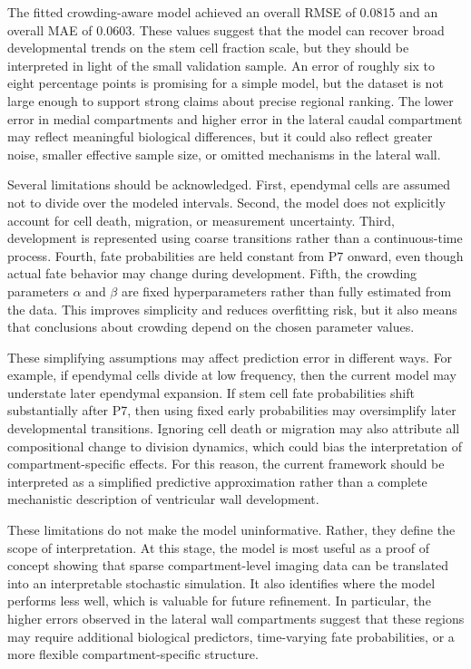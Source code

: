 \documentclass[12pt]{article}
\begin{document}
The fitted crowding-aware model achieved an overall RMSE of 0.0815 and an overall MAE of 0.0603. These values suggest that the model can recover broad developmental trends on the stem cell fraction scale, but they should be interpreted in light of the small validation sample. An error of roughly six to eight percentage points is promising for a simple model, but the dataset is not large enough to support strong claims about precise regional ranking. The lower error in medial compartments and higher error in the lateral caudal compartment may reflect meaningful biological differences, but it could also reflect greater noise, smaller effective sample size, or omitted mechanisms in the lateral wall.

Several limitations should be acknowledged. First, ependymal cells are assumed not to divide over the modeled intervals. Second, the model does not explicitly account for cell death, migration, or measurement uncertainty. Third, development is represented using coarse transitions rather than a continuous-time process. Fourth, fate probabilities are held constant from P7 onward, even though actual fate behavior may change during development. Fifth, the crowding parameters $\alpha$ and $\beta$ are fixed hyperparameters rather than fully estimated from the data. This improves simplicity and reduces overfitting risk, but it also means that conclusions about crowding depend on the chosen parameter values.

These simplifying assumptions may affect prediction error in different ways. For example, if ependymal cells divide at low frequency, then the current model may understate later ependymal expansion. If stem cell fate probabilities shift substantially after P7, then using fixed early probabilities may oversimplify later developmental transitions. Ignoring cell death or migration may also attribute all compositional change to division dynamics, which could bias the interpretation of compartment-specific effects. For this reason, the current framework should be interpreted as a simplified predictive approximation rather than a complete mechanistic description of ventricular wall development.

These limitations do not make the model uninformative. Rather, they define the scope of interpretation. At this stage, the model is most useful as a proof of concept showing that sparse compartment-level imaging data can be translated into an interpretable stochastic simulation. It also identifies where the model performs less well, which is valuable for future refinement. In particular, the higher errors observed in the lateral wall compartments suggest that these regions may require additional biological predictors, time-varying fate probabilities, or a more flexible compartment-specific structure.
\end{document}
